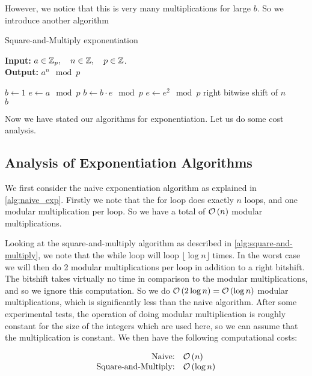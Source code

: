 However, we notice that this is very many multiplications for large $b$.
So we introduce another algorithm

\begin{algorithm}
  \caption{Square-and-Multiply exponentiation}
  \label{alg:square-and-multiply}
  \textbf{Input:} $a \in \mathbb{Z}_p, \quad n \in \mathbb{Z}, \quad p \in \mathbb{Z}$. \\
  \textbf{Output:} $a^n \mod{p}$
  \begin{algorithmic}[1]
    \State $b \gets 1$
    \State $e \gets a \mod{p}$
        \State $b \gets b \cdot e \mod{p}$
      \EndIf
      \State $e \gets e^2 \mod{p}$
      \State right bitwise shift of $n$
    \EndWhile \\
    \Return $b$
  \end{algorithmic}
\end{algorithm}


Now we have stated our algorithms for exponentiation. Let us do some cost analysis. \\


\subsection{Analysis of Exponentiation Algorithms}

We first consider the naive exponentiation algorithm as explained in \autoref{alg:naive_exp}.
Firstly we note that the for loop does exactly $n$ loops, and one modular multiplication per loop.
So we have a total of $\mathcal{O} \left( n \right)$ modular multiplications.

Looking at the square-and-multiply algorithm as described in \autoref{alg:square-and-multiply}, we note that the while loop will loop $\lfloor \log n \rfloor$ times.
In the worst case we will then do 2 modular multiplications per loop in addition to a right bitshift.
The bitshift takes virtually no time in comparison to the modular multiplications, and so we ignore this computation.
So we do $\mathcal{O} \left( 2\log n \right) = \mathcal{O} \left(  \log n  \right)$ modular multiplications, which is significantly less than the naive algorithm.
After some experimental tests, the operation of doing modular multiplication is roughly constant for the size of the integers which are used here, so we can assume that the multiplication is constant.
We then have the following computational costs:


\begin{equation}
  \label{ref:costs}
  \begin{array}{rl}
    \text{Naive:} & \mathcal{O} \left( n \right) \\
    \text{Square-and-Multiply:} & \mathcal{O} \left(  \log n  \right)
  \end{array}
\end{equation}


